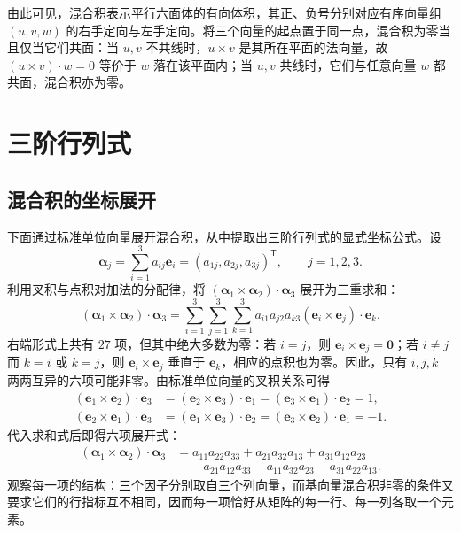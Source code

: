 \documentclass[UTF8, fontset=fandol, a4paper, 12pt]{ctexart}
\theoremstyle{definition}
\begin{document}
由此可见，混合积表示平行六面体的有向体积，其正、负号分别对应有序向量组 $(u,v,w)$ 的右手定向与左手定向。将三个向量的起点置于同一点，混合积为零当且仅当它们共面：当 $u,v$ 不共线时，$u\times v$ 是其所在平面的法向量，故 $(u\times v)\cdot w=0$ 等价于 $w$ 落在该平面内；当 $u,v$ 共线时，它们与任意向量 $w$ 都共面，混合积亦为零。

\section{三阶行列式}

\subsection{混合积的坐标展开}

下面通过标准单位向量展开混合积，从中提取出三阶行列式的显式坐标公式。设
\[
\boldsymbol\alpha_j=\sum_{i=1}^3a_{ij}\boldsymbol e_i
=(a_{1j},a_{2j},a_{3j})^{\mathsf T},\qquad j=1,2,3.
\]
利用叉积与点积对加法的分配律，将 $(\boldsymbol\alpha_1\times\boldsymbol\alpha_2)\cdot\boldsymbol\alpha_3$ 展开为三重求和：
\[
(\boldsymbol\alpha_1\times\boldsymbol\alpha_2)\cdot\boldsymbol\alpha_3
=\sum_{i=1}^3\sum_{j=1}^3\sum_{k=1}^3
 a_{i1}a_{j2}a_{k3}(\boldsymbol e_i\times\boldsymbol e_j)\cdot\boldsymbol e_k.
\]
右端形式上共有 $27$ 项，但其中绝大多数为零：若 $i=j$，则 $\boldsymbol e_i\times\boldsymbol e_j=\boldsymbol0$；若 $i\ne j$ 而 $k=i$ 或 $k=j$，则 $\boldsymbol e_i\times\boldsymbol e_j$ 垂直于 $\boldsymbol e_k$，相应的点积也为零。因此，只有 $i,j,k$ 两两互异的六项可能非零。由标准单位向量的叉积关系可得
\begin{align*}
(\boldsymbol e_1\times\boldsymbol e_2)\cdot\boldsymbol e_3
&=(\boldsymbol e_2\times\boldsymbol e_3)\cdot\boldsymbol e_1
=(\boldsymbol e_3\times\boldsymbol e_1)\cdot\boldsymbol e_2=1,\\
(\boldsymbol e_2\times\boldsymbol e_1)\cdot\boldsymbol e_3
&=(\boldsymbol e_1\times\boldsymbol e_3)\cdot\boldsymbol e_2
=(\boldsymbol e_3\times\boldsymbol e_2)\cdot\boldsymbol e_1=-1.
\end{align*}
代入求和式后即得六项展开式：
\begin{align*}
(\boldsymbol\alpha_1\times\boldsymbol\alpha_2)\cdot\boldsymbol\alpha_3
&=a_{11}a_{22}a_{33}+a_{21}a_{32}a_{13}+a_{31}a_{12}a_{23}\\
&\quad-a_{21}a_{12}a_{33}-a_{11}a_{32}a_{23}-a_{31}a_{22}a_{13}.
\end{align*}
观察每一项的结构：三个因子分别取自三个列向量，而基向量混合积非零的条件又要求它们的行指标互不相同，因而每一项恰好从矩阵的每一行、每一列各取一个元素。
\end{document}
